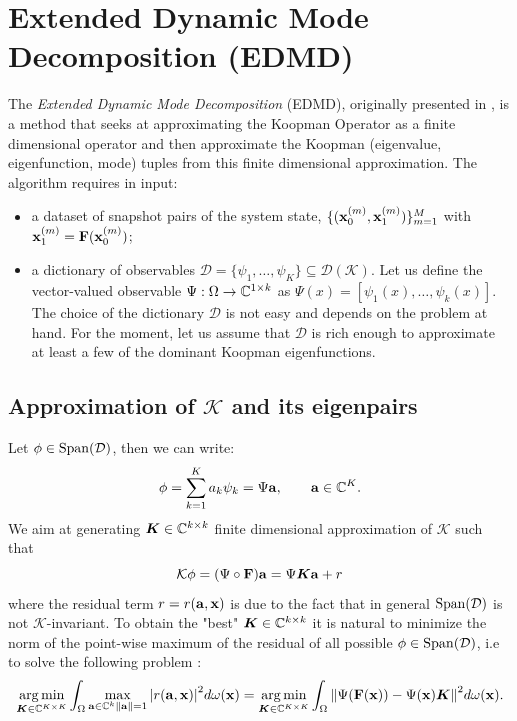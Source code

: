 \section{Extended Dynamic Mode Decomposition (EDMD)}
\label{section_edmd}
The \emph{Extended Dynamic Mode Decomposition} (EDMD), originally presented in \cite{williams_data-driven_2015}, is a method that seeks at approximating the Koopman Operator as a finite dimensional operator and then approximate the Koopman (eigenvalue, eigenfunction, mode) tuples from this finite dimensional approximation. The algorithm requires in input:
\begin{itemize}
    \item a dataset of snapshot pairs of the system state, $\{(\vb{x}_0^{(m)}, \vb{x}_1^{(m)})\}_{m = 1}^M$ with $\vb{x}_1^{(m)} = \vb{F}(\vb{x}_0^{(m)})$;
    \item a dictionary of observables $\mathcal{D} = \{\psi_1, \dots, \psi_K\} \subseteq \mathcal{D}(\mathcal{K})$. Let us define the vector-valued observable $\Psi:\Omega\to\mathbb{C}^{1\times k}$ as $\Psi(x) = [\psi_1(x), \dots, \psi_k(x)]$. The choice of the dictionary $\mathcal{D}$ is not easy and depends on the problem at hand. For the moment, let us assume that $\mathcal{D}$ is rich enough to approximate at least a few of the dominant Koopman eigenfunctions.
\end{itemize}

\subsection{Approximation of $\mathcal{K}$ and its eigenpairs}
Let $\phi\in\mathrm{Span}(\mathcal{D})$, then we can write:
\begin{equation*}
    \phi = \sum_{k=1}^K a_k\psi_k = \Psi\vb{a}, \qquad \vb{a}\in\mathbb{C}^K.
\end{equation*}
We aim at generating $\vb*{K}\in\mathbb{C}^{k\times k}$ finite dimensional approximation of $\mathcal{K}$ such that
\begin{equation}
    \label{k_finite_dimensional}
    \mathcal{K}\vb{\phi} = (\Psi \circ \vb{F})\vb{a} = \Psi\vb*K\vb{a} + r
\end{equation}
where the residual term $r = r(\vb{a}, \vb{x})$ is due to the fact that in general $\mathrm{Span}(\mathcal{D})$ is not $\mathcal{K}$-invariant. To obtain the "best" $\vb*{K}\in\mathbb{C}^{k\times k}$ it is natural to minimize the norm of the point-wise maximum of the residual of all possible $\phi\in\mathrm{Span}(\mathcal{D})$, i.e to solve the following problem \cite{colbrook_rigorous_2021}:
\begin{equation}
    \label{edmd_integral_problem}
    \operatorname*{arg\,min}_{\vb*{K}\in\mathbb{C}^{K\times K}}\int_{\Omega} \max_{\vb{a}\in\mathbb{C}^k \\ \norm{\vb{a}} = 1}\abs{r(\vb{a}, \vb{x})}^2 d\omega(\vb{x}) = 
    \operatorname*{arg\,min}_{\vb*{K}\in\mathbb{C}^{K\times K}}\int_{\Omega} \norm{\Psi(\vb{F}(\vb{x})) - \Psi(\vb{x})\vb*{K}}^2 d\omega(\vb{x}).
\end{equation}

